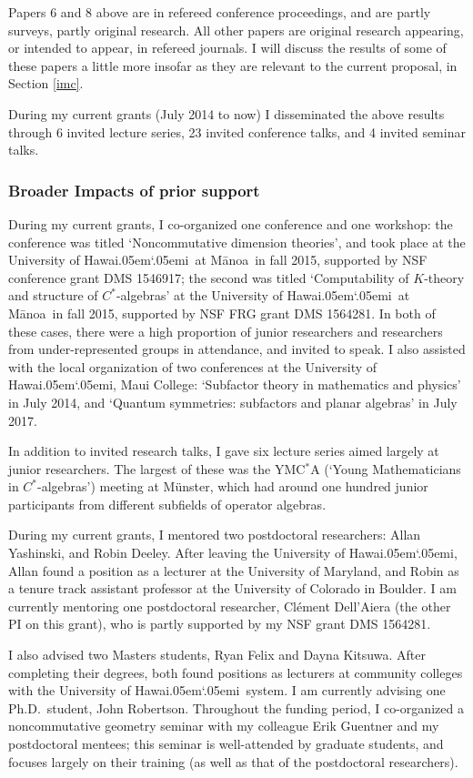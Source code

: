 \documentclass[11pt]{article}
\newcommand{\Manoa}{M\=anoa}
\newcommand{\Hawaii}{Hawai\kern.05em`\kern.05em\relax i}
\theoremstyle{plain}
\theoremstyle{definition}
\theoremstyle{remark}
\begin{document}
Papers 6 and 8 above are in refereed conference proceedings, and are partly surveys, partly original research.  All other papers are original research appearing, or intended to appear, in refereed journals.  I will discuss the results of some of these papers a little more insofar as they are relevant to the current proposal, in Section \ref{imc}.


During my current grants (July 2014 to now) I disseminated the above results through 6 invited lecture series, 23 invited conference talks, and 4 invited seminar talks.  

 
\subsubsection*{Broader Impacts of prior support}
During my current grants, I co-organized one conference and one workshop: the conference was titled `Noncommutative dimension theories', and took place at the University of \Hawaii ~at \Manoa~in fall 2015, supported by NSF conference grant DMS 1546917; the second was titled  `Computability of $K$-theory and structure of $C^*$-algebras' at the University of \Hawaii ~at \Manoa~in fall 2015, supported by NSF FRG grant DMS 1564281.  In both of these cases, there were a high proportion of junior researchers and researchers from under-represented groups in attendance, and invited to speak.  I also assisted with the local organization of two conferences at the University of \Hawaii, Maui College: `Subfactor theory in mathematics and physics' in July 2014, and `Quantum symmetries: subfactors and planar algebras' in July 2017.

In addition to invited research talks, I gave six lecture series aimed largely at junior researchers.  The largest of these was the YMC$^*$A (`Young Mathematicians in $C^*$-algebras') meeting at M\"{u}nster, which had around one hundred junior participants from different subfields of operator algebras.

During my current grants, I mentored two postdoctoral researchers: Allan Yashinski, and Robin Deeley.  After leaving the University of \Hawaii, Allan found a position as a lecturer at the University of Maryland, and Robin as a tenure track assistant professor at the University of Colorado in Boulder.  I am currently mentoring one postdoctoral researcher, Cl\'{e}ment Dell'Aiera (the other PI on this grant), who is partly supported by my NSF grant DMS 1564281.

I also advised two Masters students, Ryan Felix and Dayna Kitsuwa.  After completing their degrees, both found positions as lecturers at community colleges with the University of \Hawaii~system.  I am currently advising one Ph.D.\ student, John Robertson.  Throughout the funding period, I co-organized a noncommutative geometry seminar with my colleague Erik Guentner and my postdoctoral mentees; this seminar is well-attended by graduate students, and focuses largely on their training (as well as that of the postdoctoral researchers).
\end{document}
